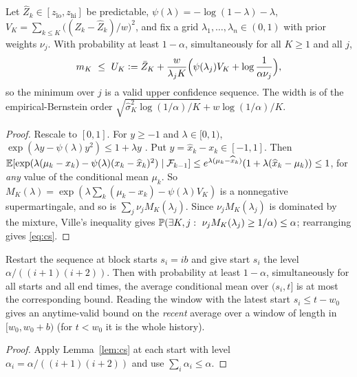 \begin{lemma}\label{lem:cs}
Let $\widehat Z_k\in[z_{\mathrm{lo}},z_{\mathrm{hi}}]$ be predictable, $\psi(\lambda)=-\log(1-\lambda)-\lambda$,
$V_K=\sum_{k\le K}\big((Z_k-\widehat Z_k)/w\big)^2$, and fix a grid $\lambda_1,\dots,\lambda_n\in(0,1)$ with
prior weights $\nu_j$. With probability at least $1-\alpha$, simultaneously for all $K\ge1$ and all $j$,
\begin{equation}\label{eq:cs}
m_K\ \le\ U_K\vcentcolon=\bar Z_K+\frac{w}{\lambda_jK}\Big(\psi(\lambda_j)V_K+\log\frac1{\alpha\nu_j}\Big),
\end{equation}
so the minimum over $j$ is a valid upper confidence sequence. The width is of the empirical-Bernstein order
$\sqrt{\hat\sigma_K^2\log(1/\alpha)/K}+w\log(1/\alpha)/K$.
\end{lemma}
\begin{proof}
Rescale to $[0,1]$. For $y\ge-1$ and $\lambda\in[0,1)$, $\exp(\lambda y-\psi(\lambda)y^2)\le1+\lambda y$
\citep{fan2015exponential}. Put $y=\widehat x_k-x_k\in[-1,1]$. Then
$\mathbb{E}[\exp(\lambda(\mu_k-x_k)-\psi(\lambda)(x_k-\widehat x_k)^2)\mid\mathcal{F}_{k-1}]\le e^{\lambda(\mu_k-\widehat x_k)}(1+\lambda(\widehat x_k-\mu_k))\le1$,
for \emph{any} value of the conditional mean $\mu_k$. So $M_K(\lambda)=\exp(\lambda\sum_k(\mu_k-x_k)-\psi(\lambda)V_K)$ is a nonnegative supermartingale, and so is
$\sum_j\nu_jM_K(\lambda_j)$. Since $\nu_jM_K(\lambda_j)$ is dominated by the mixture, Ville's inequality gives
$\PR(\exists K,j:\ \nu_jM_K(\lambda_j)\ge1/\alpha)\le\alpha$; rearranging gives \eqref{eq:cs}.
\end{proof}

\begin{corollary}[Windows]\label{cor:window}
Restart the sequence at block starts $s_i=ib$ and give start $s_i$ the level $\alpha/((i+1)(i+2))$. Then with probability at least $1-\alpha$, simultaneously
for all starts and all end times, the average conditional mean over $(s_i,t]$ is at most the corresponding bound.
Reading the window with the latest start $s_i\le t-w_0$ gives an anytime-valid bound on the \emph{recent} average over a window of length in $[w_0,w_0+b)$ (for $t<w_0$ it is the whole history).
\end{corollary}
\begin{proof}
Apply Lemma~\ref{lem:cs} at each start with level $\alpha_i=\alpha/((i+1)(i+2))$ and use $\sum_i\alpha_i\le\alpha$.
\end{proof}

